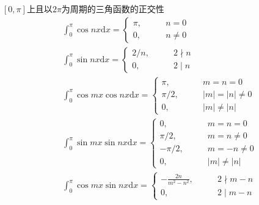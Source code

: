 \documentclass[lang = cn, scheme = chinese, thmcnt = section]{elegantbook}
\newcommand{\dd}{\mathrm{d}}           %
\newcommand{\dis}{\displaystyle}
\begin{document}
\begin{theorem}{$[0,\pi]$上且以$2\pi$为周期的三角函数的正交性}
	\begin{align*}
		& \int_{0}^{\pi}\cos nx\dd x=\begin{cases}
			\pi,\qquad & n=0\\
			0,\qquad & n\ne 0
		\end{cases}\\
		& \int_{0}^{\pi}\sin nx\dd x=\begin{cases}
			2/n,\qquad & 2\nmid n\\
			0,\qquad & 2\mid n
		\end{cases}\\
		& \int_{0}^{\pi}\cos mx\cos nx \dd x=\begin{cases}
			\pi,\qquad & m=n=0\\
			\pi/2,\qquad & |m|=|n|\ne 0\\
			0,\qquad & |m|\ne |n|
		\end{cases}\\
		& \int_{0}^{\pi}\sin mx\sin nx \dd x=\begin{cases}
			0,\qquad & m=n=0\\
			\pi/2,\qquad & m=n\ne 0\\
			-\pi/2,\qquad & m=-n\ne 0\\
			0,\qquad & |m|\ne |n|
		\end{cases}\\
		& \int_{0}^{\pi}\cos mx\sin nx\dd x=\begin{cases}
			\dis-\frac{2n}{m^2-n^2},\qquad & 2\nmid m-n\\
			0,\qquad & 2\mid m-n
		\end{cases}
	\end{align*}
\end{theorem}
\end{document}

